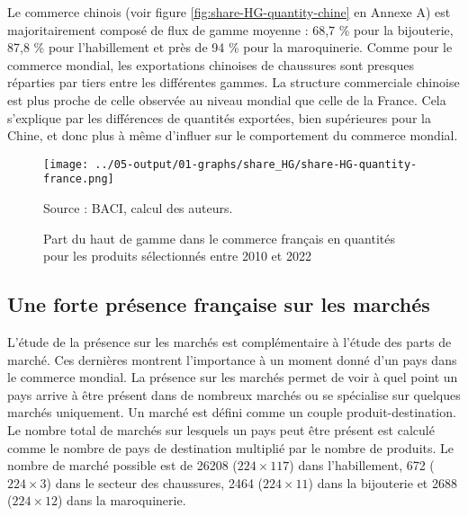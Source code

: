 \documentclass[french,10pt,a4paper]{article}
\begin{document}
Le commerce chinois (voir figure \ref{fig:share-HG-quantity-chine} en Annexe A) est majoritairement composé de flux de gamme moyenne : 68,7 \% pour la bijouterie, 87,8 \% pour l'habillement et près de 94 \% pour la maroquinerie. Comme pour le commerce mondial, les exportations chinoises de chaussures sont presques réparties par tiers entre les différentes gammes. La structure commerciale chinoise est plus proche de celle observée au niveau mondial que celle de la France. Cela s'explique par les différences de quantités exportées, bien supérieures pour la Chine, et donc plus à même d'influer sur le comportement du commerce mondial.

\begin{figure}[!h]
  \centering
  \texttt{[image: ../05-output/01-graphs/share\_HG/share-HG-quantity-france.png]}
  \captionsetup{justification=raggedright,singlelinecheck=false, font=small}
  \caption*{Source : BACI, calcul des auteurs.}
  \captionsetup{justification=centering, singlelinecheck=true, font=normalsize}
  \caption{Part du haut de gamme dans le commerce français en quantités pour les produits sélectionnés entre 2010 et 2022}
  \label{fig:share-HG-quantity-france}
\end{figure}


\subsection{Une forte présence française sur les marchés}
L'étude de la présence sur les marchés est complémentaire à l'étude des parts de marché. Ces dernières montrent l'importance à un moment donné d'un pays dans le commerce mondial. La présence sur les marchés permet de voir à quel point un pays arrive à être présent dans de nombreux marchés ou se spécialise sur quelques marchés uniquement. Un marché est défini comme un couple produit-destination. Le nombre total de marchés sur lesquels un pays peut être présent est calculé comme le nombre de pays de destination multiplié par le nombre de produits. Le nombre de marché possible est de 26208 ($224 \times 117$) dans l'habillement, 672 ($224 \times 3$) dans le secteur des chaussures, 2464 ($224 \times 11$) dans la bijouterie et 2688 ($224 \times 12$) dans la maroquinerie.

\bigskip
\end{document}
